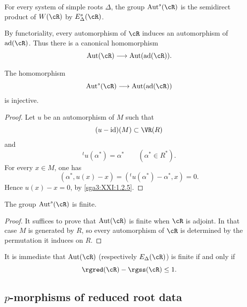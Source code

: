 \begin{proposition}\label{sga3:XXI:6.7.5}
For every system of simple roots \(\Delta\), the group
\(\operatorname{Aut}^{s}(\cR)\) is the semidirect product of
\(W(\cR)\) by \(E_\Delta^{s}(\cR)\).
\end{proposition}

By functoriality, every automorphism of \(\cR\) induces an
automorphism of \(\operatorname{ad}(\cR)\). Thus there is a
canonical homomorphism
\[
 \operatorname{Aut}(\cR)\longrightarrow
 \operatorname{Aut}(\operatorname{ad}(\cR)).
\]

\begin{lemma}\label{sga3:XXI:6.7.6}
The homomorphism
\[
 \operatorname{Aut}^{s}(\cR)\longrightarrow
 \operatorname{Aut}(\operatorname{ad}(\cR))
\]
is injective.
\end{lemma}

\begin{proof}
Let \(u\) be an automorphism of \(M\) such that
\[
 (u-\operatorname{id})(M)\subset\VR(R)
\]
and
\[
 {}^tu(\alpha^\ast)=\alpha^\ast
 \qquad(\alpha^\ast\in R^\ast).
\]
For every \(x\in M\), one has
\[
 (\alpha^\ast,u(x)-x)
 =({}^tu(\alpha^\ast)-\alpha^\ast,x)=0.
\]
Hence \(u(x)-x=0\), by \ref{sga3:XXI:1.2.5}.
\end{proof}

\begin{lemma}\label{sga3:XXI:6.7.7}
The group \(\operatorname{Aut}^{s}(\cR)\) is finite.
\end{lemma}

\begin{proof}
It suffices to prove that \(\operatorname{Aut}(\cR)\) is finite when
\(\cR\) is adjoint. In that case \(M\) is generated by \(R\), so
every automorphism of \(\cR\) is determined by the permutation it
induces on \(R\).
\end{proof}


\begin{remark}\label{sga3:XXI:6.7.8}
It is immediate that \(\operatorname{Aut}(\cR)\) (respectively
\(E_\Delta(\cR)\)) is finite if and only if
\[
 \rgred(\cR)-\rgss(\cR)\leq1.
\]
\end{remark}

\subsection{\(p\)-morphisms of reduced root data}
\label{sga3:XXI:6.8}

